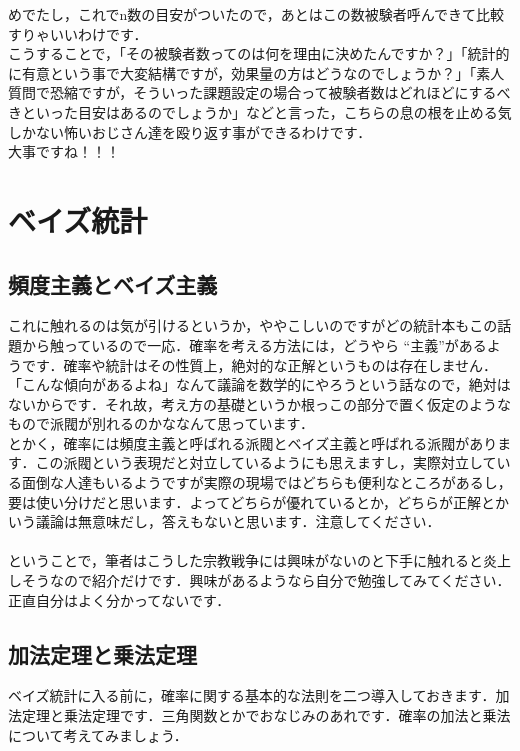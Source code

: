\documentclass[11pt,a4paper]{ujreport} 	%
\begin{document}
めでたし，これでn数の目安がついたので，あとはこの数被験者呼んできて比較すりゃいいわけです．\\

こうすることで，「その被験者数ってのは何を理由に決めたんですか？」「統計的に有意という事で大変結構ですが，効果量の方はどうなのでしょうか？」「素人質問で恐縮ですが，そういった課題設定の場合って被験者数はどれほどにするべきといった目安はあるのでしょうか」などと言った，こちらの息の根を止める気しかない怖いおじさん達を殴り返す事ができるわけです．\\

大事ですね！！！

\newpage
\chapter{ベイズ統計}
\section{頻度主義とベイズ主義}
これに触れるのは気が引けるというか，ややこしいのですがどの統計本もこの話題から触っているので一応．確率を考える方法には，どうやら ``主義''があるようです．確率や統計はその性質上，絶対的な正解というものは存在しません．「こんな傾向があるよね」なんて議論を数学的にやろうという話なので，絶対はないからです．それ故，考え方の基礎というか根っこの部分で置く仮定のようなもので派閥が別れるのかななんて思っています．\\

とかく，確率には頻度主義と呼ばれる派閥とベイズ主義と呼ばれる派閥があります．この派閥という表現だと対立しているようにも思えますし，実際対立している面倒な人達もいるようですが実際の現場ではどちらも便利なところがあるし，要は使い分けだと思います．よってどちらが優れているとか，どちらが正解とかいう議論は無意味だし，答えもないと思います．注意してください．\\
\\

ということで，筆者はこうした宗教戦争には興味がないのと下手に触れると炎上しそうなので紹介だけです．興味があるようなら自分で勉強してみてください．正直自分はよく分かってないです．

\section{加法定理と乗法定理}
ベイズ統計に入る前に，確率に関する基本的な法則を二つ導入しておきます．加法定理と乗法定理です．三角関数とかでおなじみのあれです．確率の加法と乗法について考えてみましょう．\\
\\
\end{document}

